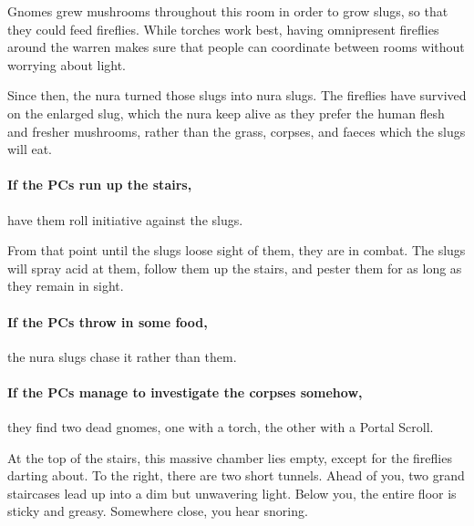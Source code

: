 \begin{multicols}{2}
\begin{boxtext}
\end{boxtext}

\begin{exampletext}

Gnomes grew mushrooms throughout this room in order to grow slugs, so that they could feed fireflies.
While torches work best, having omnipresent fireflies around the warren makes sure that people can coordinate between rooms without worrying about light.

Since then, the nura turned those slugs into nura slugs.
The fireflies have survived on the enlarged slug, which the nura keep alive as they prefer the human flesh and fresher mushrooms, rather than the grass, corpses, and faeces which the slugs will eat.

\end{exampletext}

\paragraph{If the PCs run up the stairs,}
have them roll initiative against the slugs.

From that point until the slugs loose sight of them, they are in combat.
The slugs will spray acid at them, follow them up the stairs, and pester them for as long as they remain in sight.

\paragraph{If the PCs throw in some food,}
the nura slugs chase it rather than them.

\paragraph{If the PCs manage to investigate the corpses somehow,}
they find two dead gnomes, one with a torch, the other with a Portal Scroll.



\begin{boxtext}

	At the top of the stairs, this massive chamber lies empty, except for the fireflies darting about.
	To the right, there are two short tunnels.
	Ahead of you, two grand staircases lead up into a dim but unwavering light.
	Below you, the entire floor is sticky and greasy.
	Somewhere close, you hear snoring.


\end{boxtext}
\end{multicols}
